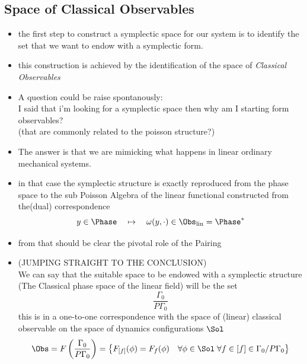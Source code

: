 \documentclass[a4paper,11pt]{scrartcl}
\begin{document}
    \subsection{Space of Classical Observables}
    \begin{itemize}
        \item the first step to construct a symplectic space for our system is to identify the set that we want to endow with a symplectic form.
        \item this construction is achieved by the identification of the space of \emph{Classical Observables}
        \item A question could be raise spontanously:\\
        I said that i'm looking for a symplectic space then why am I starting form observables? \\
        (that are commonly related to the poisson structure?)
        \item The answer is that we are mimicking what happens in linear ordinary mechanical systems.
        \item in that case the symplectic structure is exactly reproduced from the phase space to the sub Poisson Algebra of the linear functional constructed from the(dual) correspondence
        $$ y \in \Phase \quad \mapsto \quad \omega(y,\cdot) \in \Obs_{\textrm{lin}} = \Phase^* $$
        \item from that should be clear the pivotal role of the Pairing
        \item (JUMPING STRAIGHT TO THE CONCLUSION)\\
        We can say that the suitable space to be endowed with a symplectic structure (The Classical phase space of the linear field)
        will be the set
        $$\frac{\Gamma_0}{P\Gamma_0} $$
        this is in a one-to-one correspondence with the space of (linear) classical observable on the space of dynamics configurations $\Sol$
        $$ \Obs = F\left( \frac{\Gamma_0}{P\Gamma_0}  \right) =\left\{ F_{[f]}(\phi) = F_f(\phi) \quad \forall \phi \in \Sol \; \forall f \in [f] \in \Gamma_0/P\Gamma_0 \right\} $$
    \end{itemize}
\end{document}
